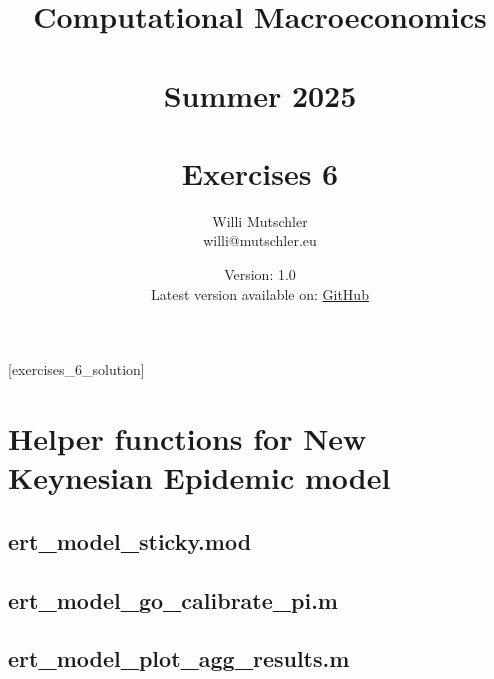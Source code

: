 
\newif\ifDisplaySolutions\DisplaySolutionstrue%


\title{Computational Macroeconomics\\~\\Summer 2025\\~\\Exercises 6}
\author{Willi Mutschler\\willi@mutschler.eu}
\date{Version: 1.0\\Latest version available on: \href{https://github.com/wmutschl/Computational-Macroeconomics/releases/latest/download/exercises_6.pdf}{GitHub}}
\maketitle\thispagestyle{empty}

\newpage
{}[exercises_6_solution]
\tableofcontents\thispagestyle{empty}\newpage

\setcounter{page}{1}
\newpage

\printbibliography%
\newpage

\appendix
\section{Helper functions for New Keynesian Epidemic model}
\subsection{ert\_model\_sticky.mod\label{app:ert_model_sticky}}


\subsection{ert\_model\_go\_calibrate\_pi.m\label{app:ert_model_go_calibrate_pi}}


\subsection{ert\_model\_plot\_agg\_results.m\label{app:ert_model_plot_agg_results}}


